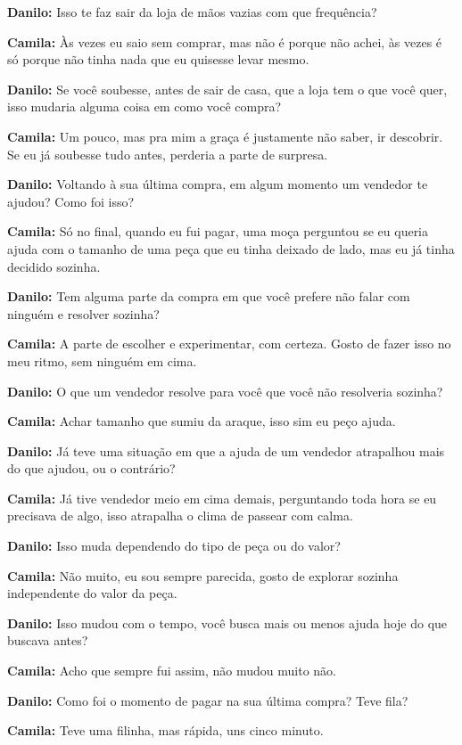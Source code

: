 \textbf{Danilo:} Isso te faz sair da loja de mãos vazias com que frequência?

\textbf{Camila:} Às vezes eu saio sem comprar, mas não é porque não achei, às vezes é só porque não tinha nada que eu quisesse levar mesmo.

\textbf{Danilo:} Se você soubesse, antes de sair de casa, que a loja tem o que você quer, isso mudaria alguma coisa em como você compra?

\textbf{Camila:} Um pouco, mas pra mim a graça é justamente não saber, ir descobrir. Se eu já soubesse tudo antes, perderia a parte de surpresa.

\textbf{Danilo:} Voltando à sua última compra, em algum momento um vendedor te ajudou? Como foi isso?

\textbf{Camila:} Só no final, quando eu fui pagar, uma moça perguntou se eu queria ajuda com o tamanho de uma peça que eu tinha deixado de lado, mas eu já tinha decidido sozinha.

\textbf{Danilo:} Tem alguma parte da compra em que você prefere não falar com ninguém e resolver sozinha?

\textbf{Camila:} A parte de escolher e experimentar, com certeza. Gosto de fazer isso no meu ritmo, sem ninguém em cima.

\textbf{Danilo:} O que um vendedor resolve para você que você não resolveria sozinha?

\textbf{Camila:} Achar tamanho que sumiu da araque, isso sim eu peço ajuda.

\textbf{Danilo:} Já teve uma situação em que a ajuda de um vendedor atrapalhou mais do que ajudou, ou o contrário?

\textbf{Camila:} Já tive vendedor meio em cima demais, perguntando toda hora se eu precisava de algo, isso atrapalha o clima de passear com calma.

\textbf{Danilo:} Isso muda dependendo do tipo de peça ou do valor?

\textbf{Camila:} Não muito, eu sou sempre parecida, gosto de explorar sozinha independente do valor da peça.

\textbf{Danilo:} Isso mudou com o tempo, você busca mais ou menos ajuda hoje do que buscava antes?

\textbf{Camila:} Acho que sempre fui assim, não mudou muito não.

\textbf{Danilo:} Como foi o momento de pagar na sua última compra? Teve fila?

\textbf{Camila:} Teve uma filinha, mas rápida, uns cinco minuto.

